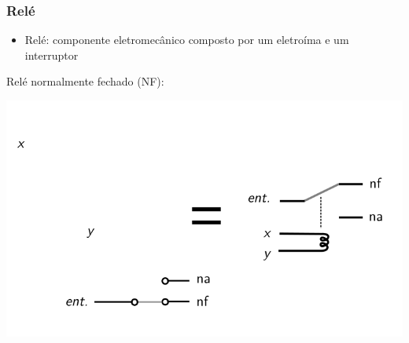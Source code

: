 \documentclass{beamer}
\begin{document}
\begin{frame}
{}

\end{frame}

\begin{frame}
\frametitle{Relé}

\begin{itemize}
\item Relé: componente eletromecânico composto por um eletroíma e um interruptor
\end{itemize}

Relé normalmente fechado (NF):

\centering%
\includegraphics{images/magneto5}%

\end{frame}
\end{document}
